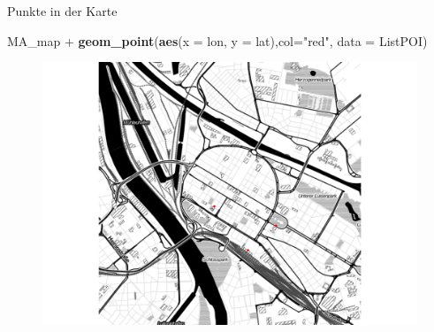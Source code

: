 \documentclass[ignorenonframetext,]{beamer}
\newenvironment{Shaded}{}{}
\newcommand{\KeywordTok}[1]{\textcolor[rgb]{0.00,0.44,0.13}{\textbf{{#1}}}}
\newcommand{\DataTypeTok}[1]{\textcolor[rgb]{0.56,0.13,0.00}{{#1}}}
\newcommand{\StringTok}[1]{\textcolor[rgb]{0.25,0.44,0.63}{{#1}}}
\newcommand{\NormalTok}[1]{{#1}}
\begin{document}
\begin{frame}[fragile]{Punkte in der Karte}

\begin{Shaded}
\begin{Highlighting}[]
\NormalTok{MA_map +}
\KeywordTok{geom_point}\NormalTok{(}\KeywordTok{aes}\NormalTok{(}\DataTypeTok{x =} \NormalTok{lon, }\DataTypeTok{y =} \NormalTok{lat),}\DataTypeTok{col=}\StringTok{"red"}\NormalTok{,}
\DataTypeTok{data =} \NormalTok{ListPOI)}
\end{Highlighting}
\end{Shaded}

\begin{figure}[htbp]
\centering
\includegraphics{RSocialScience2_files/figure-beamer/unnamed-chunk-56-1.pdf}
\caption{}
\end{figure}

\end{frame}
\end{document}
